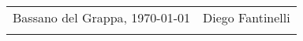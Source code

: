 \documentclass[12pt, a4paper]{exam}
\begin{document}
    
    
    
      
    
    
    
    
    
    





\vfill



\begin{tabular}{p{}p{}}
    Bassano del Grappa, \today  & Diego Fantinelli \\[8pt]
    & \hrulefill \\
\end{tabular}
\end{document}
